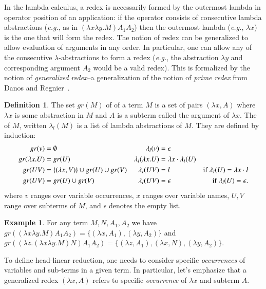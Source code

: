 \documentclass{elsarticle}
\makeatletter
\theoremstyle{plain}
\theoremstyle{definition}
\newtheorem{definition}{Definition}[section]
\newtheorem{example}{Example}[section]
\renewcommand\eg{{\it e.g.\@\xspace}}
\makeatother
\begin{document}
In the lambda calculus, a redex is necessarily formed by the outermost lambda in operator position of an application: if the operator consists of consecutive lambda abstractions (\eg, as in $(\lambda x \lambda y . M) A_1 A_2$) then the outermost lambda (\eg, $\lambda x$) is the one that will form the redex. The notion of redex can be generalized to allow evaluation of arguments in any order. In particular, one can allow any of the consecutive $\lambda$-abstractions to form a redex (\eg, the abstraction $\lambda y$ and corresponding argument $A_2$ would be a valid redex). This is formalized by the notion of \emph{generalized redex}--a generalization of the notion of \emph{prime redex} from Danos and Regnier~\cite{danos-head,REGNIER1994281}.
\begin{definition}
\label{dfn:generalized_redex}
The set $gr(M)$ of  of a term $M$ is
a set of pairs $(\lambda x, A)$ where $\lambda x$ is some abstraction in $M$ and $A$ is a subterm called the argument of $\lambda x$.
The  of $M$, written $\lambda_l(M)$ is a list of lambda abstractions of $M$. They are defined by induction:
\begin{align*}
gr(v) &= \emptyset & \lambda_l(v) &= \epsilon\\
gr(\lambda x. U) &= gr(U) & \lambda_l(\lambda x. U) &= \lambda x \cdot \lambda_l(U) \\
gr(U V) &= \{ (\lambda x, V) \} \cup gr(U) \cup gr(V) &
\lambda_l(U V) &= l & \mbox{if $\lambda_l(U) = \lambda x \cdot l$} \\
gr(U V) &= gr(U) \cup gr(V) & \lambda_l(U V) &= \epsilon & \mbox{if $\lambda_l(U) = \epsilon$.}
\end{align*}
where $v$ ranges over variable occurrences, $x$ ranges over variable names, $U, V$ range over subterms of $M$, and $\epsilon$ denotes the empty list.
\end{definition}

\begin{example} For any term $M, N, A_1, A_2$ we have
$gr((\lambda x \lambda y . M) A_1 A_2) = \{ (\lambda x, A_1), (\lambda y, A_2)\}$ and
 $gr((\lambda z . (\lambda x \lambda y . M) N) A_1 A_2) = \{ (\lambda z, A_1), (\lambda x, N), (\lambda y, A_2)\}$.
\end{example}

To define head-linear reduction, one needs to consider specific \emph{occurrences} of variables and sub-terms in a given term. In particular, let's emphasize that a generalized redex  $(\lambda x, A)$ refers to specific \emph{occurrence} of $\lambda x$ and subterm $A$.
\end{document}
